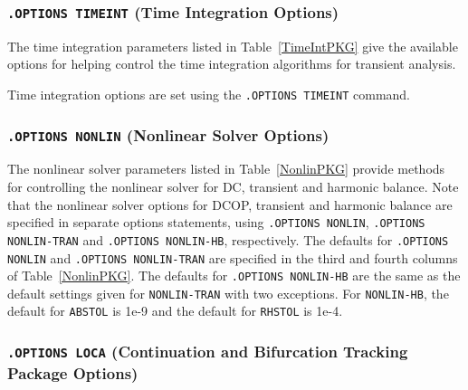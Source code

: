 


\subsubsection{\texttt{.OPTIONS TIMEINT} (Time Integration Options)}

The time integration parameters listed in Table~\ref{TimeIntPKG} give the
available options for helping control the time integration algorithms for
transient analysis.

Time integration options are set using the \texttt{.OPTIONS TIMEINT} command.




\subsubsection{\texttt{.OPTIONS NONLIN} (Nonlinear Solver Options)}

The nonlinear solver parameters listed in Table~\ref{NonlinPKG} provide
methods for controlling the nonlinear solver for 
 DC, 
 transient and harmonic balance. Note that the
nonlinear solver options for DCOP, transient and harmonic balance are
specified in separate options statements, using \texttt{.OPTIONS
 NONLIN}, \texttt{.OPTIONS NONLIN-TRAN} and \texttt{.OPTIONS
 NONLIN-HB}, respectively. The defaults for  \texttt{.OPTIONS
 NONLIN} and \texttt{.OPTIONS NONLIN-TRAN} are specified in the
third and fourth columns of Table~\ref{NonlinPKG}.  The defaults for 
\texttt{.OPTIONS NONLIN-HB} are the same as the default settings given for
\texttt{NONLIN-TRAN} with two exceptions. For \texttt{NONLIN-HB}, the default
for \texttt{ABSTOL} is 1e-9 and the default for \texttt{RHSTOL} is 1e-4.




\subsubsection{\texttt{.OPTIONS LOCA} (Continuation and Bifurcation Tracking Package Options)}

